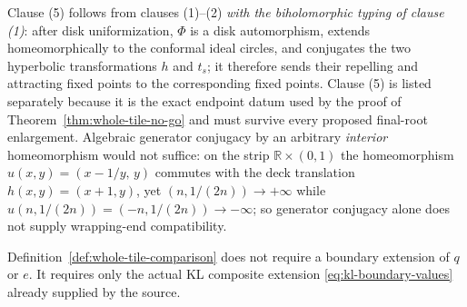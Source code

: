 \begin{remark}\label{rem:clause5}
Clause (5) follows from clauses (1)--(2) \emph{with the biholomorphic typing of clause (1)}: after disk uniformization, \(\Phi\) is a disk automorphism, extends homeomorphically to the conformal ideal circles, and conjugates the two hyperbolic transformations \(h\) and \(t_s\); it therefore sends their repelling and attracting fixed points to the corresponding fixed points.  Clause (5) is listed separately because it is the exact endpoint datum used by the proof of Theorem~\ref{thm:whole-tile-no-go} and must survive every proposed final-root enlargement.  Algebraic generator conjugacy by an arbitrary \emph{interior} homeomorphism would not suffice: on the strip \(\mathbb R\times(0,1)\) the homeomorphism \(u(x,y)=(x-1/y,\,y)\) commutes with the deck translation \(h(x,y)=(x+1,y)\), yet \((n,1/(2n))\to+\infty\) while \(u(n,1/(2n))=(-n,1/(2n))\to-\infty\); so generator conjugacy alone does not supply wrapping-end compatibility.
\end{remark}

\begin{remark}\label{rem:no-extension-needed}
Definition~\ref{def:whole-tile-comparison} does not require a boundary extension of \(q\) or \(e\).  It requires only the actual KL composite extension \eqref{eq:kl-boundary-values} already supplied by the source.
\end{remark}